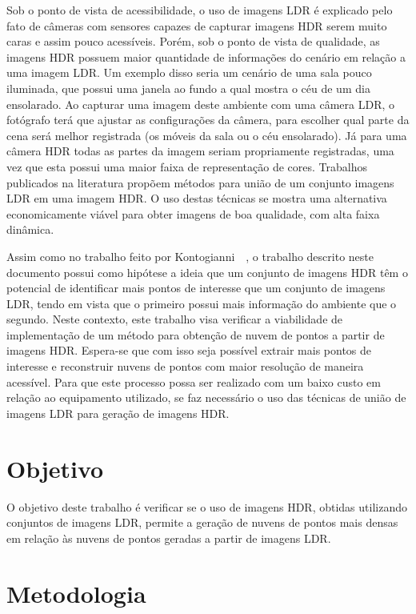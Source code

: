 Sob o ponto de vista de acessibilidade, o uso de imagens LDR é explicado pelo fato de câmeras com sensores capazes de capturar imagens HDR serem muito caras e assim pouco acessíveis. Porém, sob o ponto de vista de qualidade, as imagens HDR possuem maior quantidade de informações do cenário em relação a uma imagem LDR. Um exemplo disso seria um cenário de uma sala pouco iluminada, que possui uma janela ao fundo a qual mostra o céu de um dia ensolarado. Ao capturar uma imagem deste ambiente com uma câmera LDR, o fotógrafo terá que ajustar as configurações da câmera, para escolher qual parte da cena será melhor registrada (os móveis da sala ou o céu ensolarado). Já para uma câmera HDR todas as partes da imagem seriam propriamente registradas, uma vez que esta possui uma maior faixa de representação de cores. Trabalhos publicados na literatura propõem métodos para união de um conjunto imagens LDR em uma imagem HDR. O uso destas técnicas se mostra uma alternativa economicamente viável para obter imagens de boa qualidade, com alta faixa dinâmica.


Assim como no trabalho feito por Kontogianni~\etal~\cite{hdr3d}, o trabalho descrito neste documento possui como hipótese a ideia que um conjunto de imagens HDR têm o potencial de identificar mais pontos de interesse que um conjunto de imagens LDR, tendo em vista que o primeiro possui mais informação do ambiente que o segundo. Neste contexto, este trabalho visa verificar a viabilidade de implementação de um método para obtenção de nuvem de pontos a partir de imagens HDR. Espera-se que com isso seja possível extrair mais pontos de interesse e reconstruir nuvens de pontos com maior resolução de maneira acessível. Para que este processo possa ser realizado com um baixo custo em relação ao equipamento utilizado, se faz necessário o uso das técnicas de união de imagens LDR para geração de imagens HDR.

\section{Objetivo} \label{introducaoObjetivo}

O objetivo deste trabalho é verificar se o uso de imagens HDR, obtidas utilizando conjuntos de imagens LDR, permite a geração de nuvens de pontos mais densas em relação às nuvens de pontos geradas a partir de imagens LDR.

\section{Metodologia} \label{introducaoMetodo}

